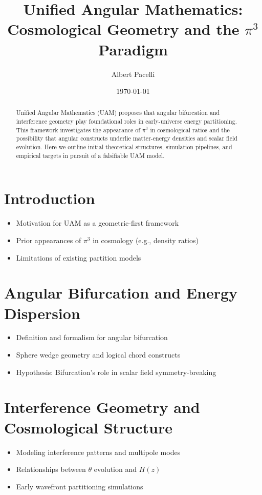 \documentclass[12pt]{article}
\title{Unified Angular Mathematics: Cosmological Geometry and the $\pi^3$ Paradigm}
\author{Albert Pacelli}
\date{\today}
\begin{document}
\maketitle

\begin{abstract}
Unified Angular Mathematics (UAM) proposes that angular bifurcation and interference geometry play foundational roles in early-universe energy partitioning. This framework investigates the appearance of $\pi^3$ in cosmological ratios and the possibility that angular constructs underlie matter-energy densities and scalar field evolution. Here we outline initial theoretical structures, simulation pipelines, and empirical targets in pursuit of a falsifiable UAM model.
\end{abstract}

\tableofcontents
\vspace{1cm}

\section{Introduction}
\begin{itemize}[leftmargin=*, label={--}]
  \item Motivation for UAM as a geometric-first framework
  \item Prior appearances of $\pi^3$ in cosmology (e.g., density ratios)
  \item Limitations of existing partition models
\end{itemize}

\section{Angular Bifurcation and Energy Dispersion}
\begin{itemize}[leftmargin=*, label={--}]
  \item Definition and formalism for angular bifurcation
  \item Sphere wedge geometry and logical chord constructs
  \item Hypothesis: Bifurcation’s role in scalar field symmetry-breaking
\end{itemize}

\section{Interference Geometry and Cosmological Structure}
\begin{itemize}[leftmargin=*, label={--}]
  \item Modeling interference patterns and multipole modes
  \item Relationships between $\theta$ evolution and $H(z)$
  \item Early wavefront partitioning simulations
\end{itemize}
\end{document}
